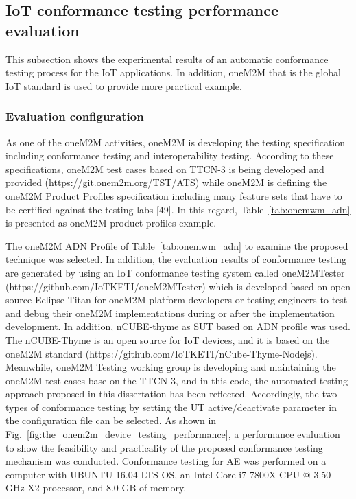 \subsection{IoT conformance testing performance evaluation}
This subsection shows the experimental results of an automatic conformance testing process for the IoT applications. In addition, oneM2M that is the global IoT standard is used to provide more practical example.



\subsubsection{Evaluation configuration}
As one of the oneM2M activities, oneM2M is developing the testing specification including conformance testing and interoperability testing. According to these specifications, oneM2M test cases based on TTCN-3 is being developed and provided (https://git.onem2m.org/TST/ATS) while oneM2M is defining the oneM2M Product Profiles specification including many feature sets that have to be certified against the testing labs [49]. In this regard, Table~\ref{tab:onemwm_adn} is presented as oneM2M product profiles example.

The oneM2M ADN Profile of Table~\ref{tab:onemwm_adn} to examine the proposed technique was selected. In addition, the evaluation results of conformance testing are generated by using an IoT conformance testing system called oneM2MTester (https://github.com/IoTKETI/oneM2MTester) which is developed based on open source Eclipse Titan for oneM2M platform developers or testing engineers to test and debug their oneM2M implementations during or after the implementation development. In addition, nCUBE-thyme as SUT based on ADN profile was used. The nCUBE-Thyme is an open source for IoT devices, and it is based on the oneM2M standard (https://github.com/IoTKETI/nCube-Thyme-Nodejs). Meanwhile, oneM2M Testing working group is developing and maintaining the oneM2M test cases base on the TTCN-3, and in this code, the automated testing approach proposed in this dissertation has been reflected. Accordingly, the two types of conformance testing by setting the UT active/deactivate parameter in the configuration file can be selected. As shown in Fig.~\ref{fig:the_onem2m_device_testing_performance}, a performance evaluation to show the feasibility and practicality of the proposed conformance testing mechanism was conducted. Conformance testing for AE was performed on a computer with UBUNTU 16.04 LTS OS, an Intel Core i7-7800X CPU @ 3.50 GHz X2 processor, and 8.0 GB of memory.

